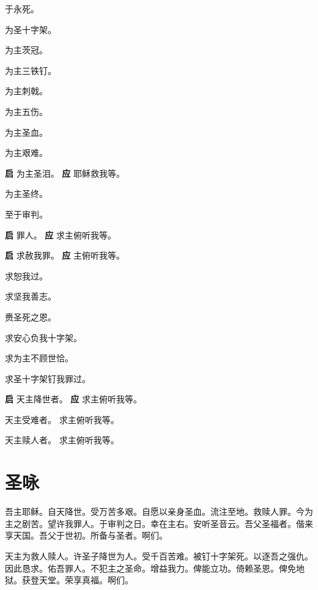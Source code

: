 \documentclass[UTF8,17pt]{ctexart}
\begin{document}
 于永死。

 为圣⼗字架。

 为主茨冠。

 为主三铁钉。

 为主刺戟。

 为主五伤。

 为主圣⾎。

 为主艰难。

\textbf{启} \quad 为主圣泪。 \hfill \textbf{应} \quad 耶稣救我等。\phantom{C}

 为主圣终。

 ⾄于审判。

\textbf{启} \quad 罪⼈。 \hfill \textbf{应} \quad 求主俯听我等。

\textbf{启} \quad 求赦我罪。 \hfill \textbf{应} \quad 主俯听我等。\phantom{c}

 求恕我过。

 求坚我善志。

 赉圣死之恩。

 求安⼼负我⼗字架。

 求为主不顾世恰。

 求圣⼗字架钉我罪过。

\textbf{启} \quad 天主降世者。 \hfill \textbf{应} \quad 求主俯听我等。

 天主受难者。 \hfill {} 求主俯听我等。

 天主赎⼈者。 \hfill {} 求主俯听我等。

\section{圣咏}

吾主耶稣。⾃天降世。受万苦多艰。⾃愿以亲⾝圣⾎。流注⾄地。救赎⼈罪。今为主之剧苦。望许我罪⼈。于审判之⽇。幸在主右。安听圣⾳云。吾⽗圣福者。偕来享天国。吾⽗于世初。所备与圣者。啊们。

天主为救⼈赎⼈。许圣⼦降世为⼈。受千百苦难。被钉⼗字架死。以逐吾之强仇。因此恳求。佑吾罪⼈。不犯主之圣命。增益我⼒。俾能⽴功。倚赖圣恩。俾免地狱。获登天堂。荣享真福。啊们。
\end{document}
